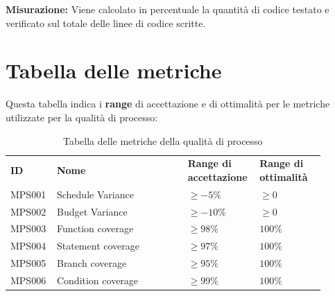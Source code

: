 \documentclass[PianoDiQualifica.tex]{subfiles}
\begin{document}
\textbf{Misurazione:}
Viene calcolato in percentuale la quantità di codice testato e verificato sul totale delle linee di codice scritte.



\section{Tabella delle metriche}
Questa tabella indica i \textbf{range} di accettazione e di ottimalità per le metriche utilizzate per la qualità di processo:
\begin{table}[H]
	\begin{center}
		\begin{tabu} to 
			\tableHeaderStyle
			
			\textbf{ID} & \textbf{Nome} & \textbf{Range di accettazione} & \textbf{Range di ottimalità}\\

			MPS001 & Schedule Variance & $ \geq -5\% $ & $ \geq 0 $ \\
			MPS002 & Budget Variance & $ \geq -10\% $ & $ \geq 0 $ \\
			MPS003 & Function coverage & $ \geq 98\% $ & $ 100\% $\\
			MPS004 & Statement coverage &  $ \geq 97\% $& $ 100\% $\\
			MPS005 & Branch coverage & $ \geq 95\% $ & $ 100\% $\\
			MPS006 & Condition coverage & $ \geq 99\% $ & $ 100\% $


		\end{tabu}
		\caption{Tabella delle metriche della qualità di processo}
		\vspace{-1em}
	\end{center}
\end{table}
\end{document}
